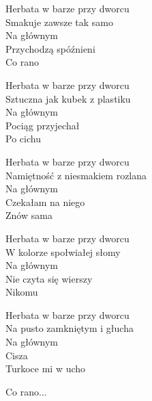 \begin{text}
    Herbata w barze przy dworcu\\
    Smakuje zawsze tak samo\\
    Na głównym\\
    Przychodzą spóźnieni\\
    Co rano

    Herbata w barze przy dworcu\\
    Sztuczna jak kubek z plastiku\\
    Na głównym\\
    Pociąg przyjechał\\
    Po cichu

    Herbata w barze przy dworcu\\
    Namiętność z niesmakiem rozlana\\
    Na głównym\\
    Czekałam na niego\\
    Znów sama

    Herbata w barze przy dworcu\\
    W kolorze społwiałej słomy\\
    Na głównym\\
    Nie czyta się wierszy\\
    Nikomu

    Herbata w barze przy dworcu\\
    Na pusto zamkniętym i głucha\\
    Na głównym\\
    Cisza\\
    Turkoce mi w ucho

    Co rano...
\end{text}
\begin{chord}

\end{chord}